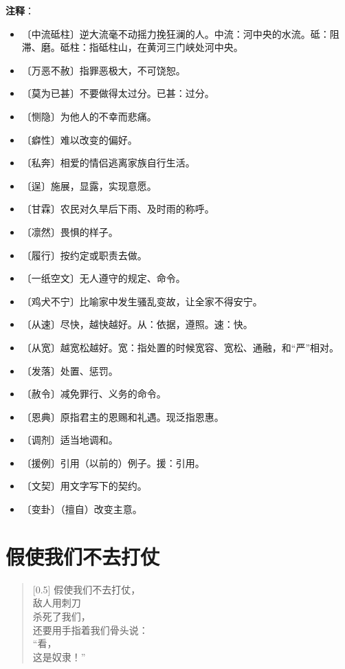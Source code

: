 \documentclass[12pt,UTF-8,openany]{ctexbook}
\begin{document}
\newpage

\textbf{注释}：

\vspace{-1em}

\begin{itemize}
    \setlength\itemsep{-0.2em}
    \item 〔中流砥柱〕逆大流毫不动摇力挽狂澜的人。中流：河中央的水流。砥：阻滞、磨。砥柱：指砥柱山，在黄河三门峡处河中央。
    \item 〔万恶不赦〕指罪恶极大，不可饶恕。
    \item 〔莫为已甚〕不要做得太过分。已甚：过分。
    \item 〔恻隐〕为他人的不幸而悲痛。
    \item 〔癖性〕难以改变的偏好。
    \item 〔私奔〕相爱的情侣逃离家族自行生活。
    \item 〔逞〕施展，显露，实现意愿。
    \item 〔甘霖〕农民对久旱后下雨、及时雨的称呼。
    \item 〔凛然〕畏惧的样子。
    \item 〔履行〕按约定或职责去做。
    \item 〔一纸空文〕无人遵守的规定、命令。
    \item 〔鸡犬不宁〕比喻家中发生骚乱变故，让全家不得安宁。
    \item 〔从速〕尽快，越快越好。从：依据，遵照。速：快。
    \item 〔从宽〕越宽松越好。宽：指处置的时候宽容、宽松、通融，和“严”相对。
    \item 〔发落〕处置、惩罚。
    \item 〔赦令〕减免罪行、义务的命令。
    \item 〔恩典〕原指君主的恩赐和礼遇。现泛指恩惠。
    \item 〔调剂〕适当地调和。
    \item 〔援例〕引用（以前的）例子。援：引用。
    \item 〔文契〕用文字写下的契约。
    \item 〔变卦〕（擅自）改变主意。
\end{itemize}

\chapter{假使我们不去打仗}

\begin{normalsize}
    
    \begin{verse}[0.5\linewidth]
        假使我们不去打仗， \\
        敌人用刺刀 \\
        杀死了我们， \\
        还要用手指着我们骨头说： \\
        “看， \\
        这是奴隶！”
    \end{verse}
    
\end{normalsize}
\end{document}
